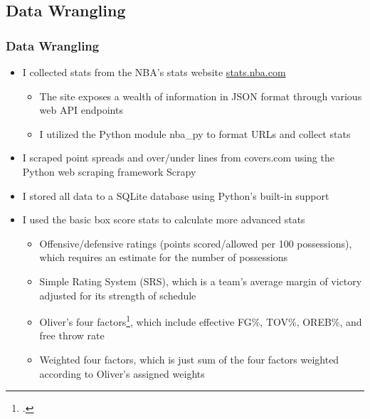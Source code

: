\documentclass{beamer}
\begin{document}
\subsection{Data Wrangling}
\begin{frame}
\frametitle{Data Wrangling}
\begin{itemize}
    \item I collected stats from the NBA's stats website \url{stats.nba.com}
    \begin{itemize}
        \item The site exposes a wealth of information in JSON format through various web API endpoints
        \item I utilized the Python module nba\_py to format URLs and collect stats
    \end{itemize}
    \item I scraped point spreads and over/under lines from covers.com using the Python web scraping framework Scrapy
    \item I stored all data to a SQLite database using Python's built-in support
    \item I used the basic box score stats to calculate more advanced stats
    \begin{itemize}
        \item Offensive/defensive ratings (points scored/allowed per 100 possessions), which requires an estimate for the number of possessions
        \item Simple Rating System (SRS), which is a team's average margin of victory adjusted for its strength of schedule
        \item Oliver's four factors\footcite{oliver}, which include effective FG\%, TOV\%, OREB\%, and free throw rate
        \item Weighted four factors, which is just sum of the four factors weighted according to Oliver's assigned weights
    \end{itemize}
\end{itemize}
\end{frame}
\end{document}
